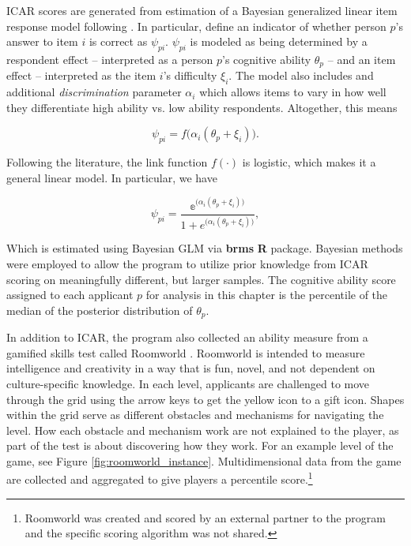 ICAR scores are generated from estimation of a Bayesian generalized linear item response model following \textcite{burkner2021bayesian}. In particular, define an indicator of whether person $p$'s answer to item $i$ is correct as $\psi_{pi}$. $\psi_{pi}$ is modeled as being determined by a respondent effect -- interpreted as a person $p$'s cognitive ability $\theta_p$ -- and an item effect -- interpreted as the item $i$'s difficulty $\xi_i$. The model also includes and additional \emph{discrimination} parameter $\alpha_i$ which allows items to vary in how well they differentiate high ability vs. low ability respondents. Altogether, this means 

\begin{equation}
\psi_{pi} = f\big(\alpha_i(\theta_p + \xi_i)\big). \nonumber
\end{equation}

Following the literature, the link function $f(\cdot)$ is logistic, which makes it a general linear model. In particular, we have

\begin{equation}
\psi_{pi} = \frac{\mathbb{e}^{\big(\alpha_i(\theta_p + \xi_i)\big)}}{1 + e^{\big(\alpha_i(\theta_p + \xi_i)\big)}}, \nonumber
\end{equation}

Which is estimated using Bayesian GLM via \textbf{brms} \textbf{R} package. Bayesian methods were employed to allow the program to utilize prior knowledge from ICAR scoring on meaningfully different, but larger samples. The cognitive ability score assigned to each applicant $p$ for analysis in this chapter is the percentile of the median of the posterior distribution of $\theta_p$.

In addition to ICAR, the program also collected an ability measure from a gamified skills test called Roomworld \cite{Dumbalska_Bhatti_Ali_Summerfield_2023}. Roomworld is intended to measure intelligence and creativity in a way that is fun, novel, and not dependent on culture-specific knowledge. In each level, applicants are challenged to move through the grid using the arrow keys to get the yellow icon to a gift icon. Shapes within the grid serve as different obstacles and mechanisms for navigating the level. How each obstacle and mechanism work are not explained to the player, as part of the test is about discovering how they work. For an example level of the game, see Figure \ref{fig:roomworld_instance}. Multidimensional data from the game are collected and aggregated to give players a percentile score.\footnote{Roomworld was created and scored by an external partner to the program and the specific scoring algorithm was not shared.}
 
